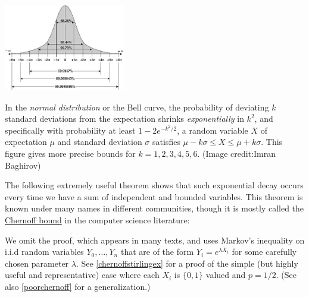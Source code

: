 \begin{marginfigure}
\centering
\includegraphics[width=\linewidth, height=1.5in, keepaspectratio]{../figure/sixsigma.jpg}
\caption{In the \emph{normal distribution} or the Bell curve, the
probability of deviating \(k\) standard deviations from the expectation
shrinks \emph{exponentially} in \(k^2\), and specifically with
probability at least \(1-2e^{-k^2/2}\), a random variable \(X\) of
expectation \(\mu\) and standard deviation \(\sigma\) satisfies
\(\mu -k\sigma \leq X \leq \mu+k\sigma\). This figure gives more precise
bounds for \(k=1,2,3,4,5,6\). (Image credit:Imran Baghirov)}
\label{empiricalbellfig}
\end{marginfigure}

The following extremely useful theorem shows that such exponential decay
occurs every time we have a sum of independent and bounded variables.
This theorem is known under many names in different communities, though
it is mostly called the
\href{https://en.wikipedia.org/wiki/Chernoff_bound}{Chernoff bound} in
the computer science literature:

\hypertarget{chernoffthm}{}

We omit the proof, which appears in many texts, and uses Markov's
inequality on i.i.d random variables \(Y_0,\ldots,Y_n\) that are of the
form \(Y_i = e^{\lambda X_i}\) for some carefully chosen parameter
\(\lambda\). See \cref{chernoffstirlingex} for a proof of the simple
(but highly useful and representative) case where each \(X_i\) is
\(\{0,1\}\) valued and \(p=1/2\). (See also \cref{poorchernoff} for a
generalization.)

